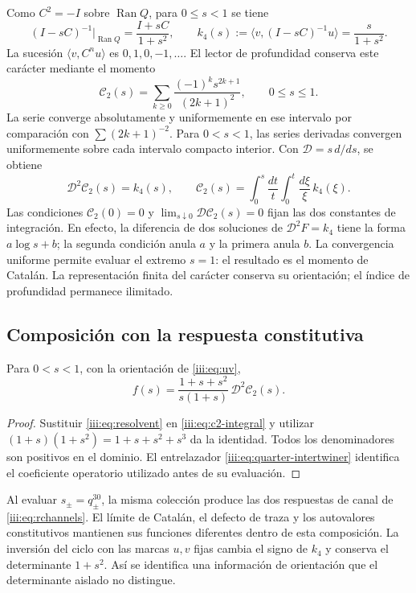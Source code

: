 Como $C^2=-I$ sobre $\operatorname{Ran}Q$, para $0\leq s<1$ se tiene
\begin{equation}
 (I-sC)^{-1}\big|_{\operatorname{Ran}Q}=\frac{I+sC}{1+s^2},
 \qquad k_4(s):=\langle v,(I-sC)^{-1}u\rangle=\frac{s}{1+s^2}.
 \label{iii:eq:resolvent}
\end{equation}
La sucesión $\langle v,C^nu\rangle$ es $0,1,0,-1,\ldots$. El lector
de profundidad conserva este carácter mediante el momento
\begin{equation}
 \mathcal C_2(s)=\sum_{k\geq0}\frac{(-1)^ks^{2k+1}}{(2k+1)^2},
 \qquad 0\leq s\leq1.
 \label{iii:eq:c2}
\end{equation}
La serie converge absolutamente y uniformemente en ese intervalo por
comparación con $\sum(2k+1)^{-2}$. Para $0<s<1$, las series derivadas
convergen uniformemente sobre cada intervalo compacto interior. Con
$\mathcal D=s\,d/ds$, se obtiene
\begin{equation}
 \mathcal D^2\mathcal C_2(s)=k_4(s),\qquad
 \mathcal C_2(s)=\int_0^s\frac{dt}{t}\int_0^t\frac{d\xi}{\xi}\,k_4(\xi).
 \label{iii:eq:c2-integral}
\end{equation}
Las condiciones $\mathcal C_2(0)=0$ y
$\lim_{s\downarrow0}\mathcal D\mathcal C_2(s)=0$ fijan las dos constantes
de integración. En efecto, la diferencia de dos soluciones de
$\mathcal D^2F=k_4$ tiene la forma $a\log s+b$; la segunda condición
anula $a$ y la primera anula $b$.
La convergencia uniforme permite evaluar el extremo $s=1$: el resultado es
el momento de Catalán. La representación finita del carácter conserva su
orientación; el índice de profundidad permanece ilimitado.

\subsection{Composición con la respuesta constitutiva}

\begin{theorem}
Para $0<s<1$, con la orientación de \eqref{iii:eq:uv},
\begin{equation}
 f(s)=\frac{1+s+s^2}{s(1+s)}\,\mathcal D^2\mathcal C_2(s).
 \label{iii:eq:catalan-vacuum}
\end{equation}
\end{theorem}
\begin{proof}
Sustituir \eqref{iii:eq:resolvent} en \eqref{iii:eq:c2-integral} y utilizar
$(1+s)(1+s^2)=1+s+s^2+s^3$ da la identidad. Todos los denominadores son
positivos en el dominio. El entrelazador \eqref{iii:eq:quarter-intertwiner}
identifica el coeficiente operatorio utilizado antes de su evaluación.
\end{proof}

Al evaluar $s_\pm=q_\pm^{30}$, la misma colección produce las dos respuestas
de canal de \eqref{iii:eq:rchannels}. El límite de Catalán, el defecto de
traza y los autovalores constitutivos mantienen sus funciones diferentes
dentro de esta composición. La inversión del ciclo con las marcas $u,v$
fijas cambia el signo de $k_4$ y conserva el determinante $1+s^2$.
Así se identifica una información de orientación que el determinante
aislado no distingue.
